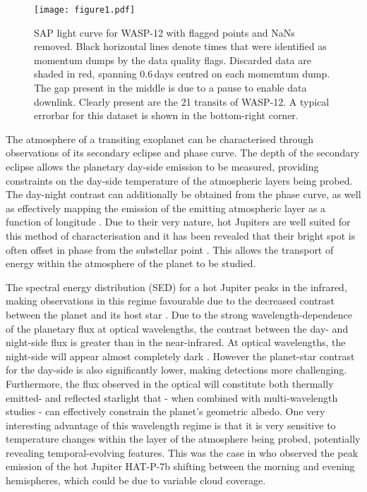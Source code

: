 \documentclass[fleqn,usenatbib]{mnras}
\begin{document}
\begin{figure*}
	\texttt{[image: figure1.pdf]}
    \caption{SAP light curve for WASP-12 with flagged points and NaNs removed. Black horizontal lines denote times that were identified as momentum dumps by the data quality flags. Discarded data are shaded in red, spanning $0.6$\,days centred on each momemtum dump. The gap present in the middle is due to a pause to enable data downlink. Clearly present are the 21 transits of WASP-12. A typical errorbar for this dataset is shown in the bottom-right corner.}
    \label{fig:figure1}
\end{figure*}

The atmosphere of a transiting exoplanet can be characterised through observations of its secondary eclipse and phase curve. The depth of the secondary eclipse allows the planetary day-side emission to be measured, providing constraints on the day-side temperature of the atmospheric layers being probed. The day-night contrast can additionally be obtained from the phase curve, as well as effectively mapping the emission of the emitting atmospheric layer as a function of longitude \citep[e.g.][]{knutson2007}. Due to their very nature, hot Jupiters are well suited for this method of characterisation and it has been revealed that their bright spot is often offset in phase from the substellar point \citep[e.g.][]{knutson2007, demooij2009, zhang2018}. This allows the transport of energy within the atmosphere of the planet to be studied.

The spectral energy distribution (SED) for a hot Jupiter peaks in the infrared, making observations in this regime favourable due to the decreased contrast between the planet and its host star \citep[e.g.][]{infra1, bell2}. Due to the strong wavelength-dependence of the planetary flux at optical wavelengths, the contrast between the day- and night-side flux is greater than in the near-infrared. At optical wavelengths, the night-side will appear almost completely dark \citep[e.g][]{snellencorot}. However the planet-star contrast for the day-side is also significantly lower, making detections more challenging. Furthermore, the flux observed in the optical will constitute both thermally emitted- and reflected starlight that - when combined with multi-wavelength studies - can effectively constrain the planet's geometric albedo. One very interesting advantage of this wavelength regime is that it is very sensitive to temperature changes within the layer of the atmosphere being probed, potentially revealing temporal-evolving features. This was the case in \citet{armstrong} who observed the peak emission of the hot Jupiter HAT-P-7b shifting between the morning and evening hemispheres, which could be due to variable cloud coverage.
\end{document}
